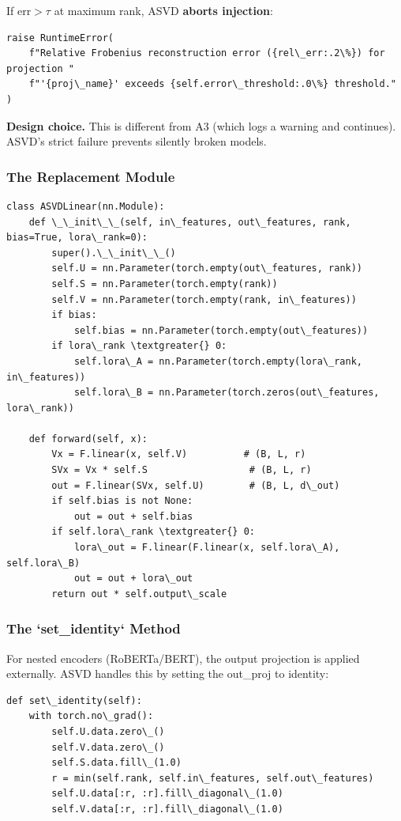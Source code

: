 If $\text{err} > \tau$ at maximum rank, ASVD \textbf{aborts injection}:

\begin{lstlisting}
raise RuntimeError(
    f"Relative Frobenius reconstruction error ({rel\_err:.2\%}) for projection "
    f"'{proj\_name}' exceeds {self.error\_threshold:.0\%} threshold."
)
\end{lstlisting}

\textbf{Design choice.} This is different from A3 (which logs a warning and 
continues). ASVD's strict failure prevents silently broken models.

\subsubsection{The Replacement Module}

\begin{lstlisting}
class ASVDLinear(nn.Module):
    def \_\_init\_\_(self, in\_features, out\_features, rank, bias=True, lora\_rank=0):
        super().\_\_init\_\_()
        self.U = nn.Parameter(torch.empty(out\_features, rank))
        self.S = nn.Parameter(torch.empty(rank))
        self.V = nn.Parameter(torch.empty(rank, in\_features))
        if bias:
            self.bias = nn.Parameter(torch.empty(out\_features))
        if lora\_rank \textgreater{} 0:
            self.lora\_A = nn.Parameter(torch.empty(lora\_rank, in\_features))
            self.lora\_B = nn.Parameter(torch.zeros(out\_features, lora\_rank))
    
    def forward(self, x):
        Vx = F.linear(x, self.V)          # (B, L, r)
        SVx = Vx * self.S                  # (B, L, r)
        out = F.linear(SVx, self.U)        # (B, L, d\_out)
        if self.bias is not None:
            out = out + self.bias
        if self.lora\_rank \textgreater{} 0:
            lora\_out = F.linear(F.linear(x, self.lora\_A), self.lora\_B)
            out = out + lora\_out
        return out * self.output\_scale
\end{lstlisting}

\subsubsection{The `set\_identity` Method}

For nested encoders (RoBERTa/BERT), the output projection is applied 
externally. ASVD handles this by setting the out\_proj to identity:

\begin{lstlisting}
def set\_identity(self):
    with torch.no\_grad():
        self.U.data.zero\_()
        self.V.data.zero\_()
        self.S.data.fill\_(1.0)
        r = min(self.rank, self.in\_features, self.out\_features)
        self.U.data[:r, :r].fill\_diagonal\_(1.0)
        self.V.data[:r, :r].fill\_diagonal\_(1.0)
\end{lstlisting}

